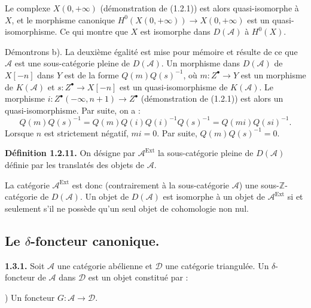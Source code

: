 \clearpage
{}%
\begingroup\small\setlength{\parskip}{0pt}\setlength{\emergencystretch}{1.5em}
\setlength{\abovedisplayskip}{4pt plus 2pt minus 2pt}%
\setlength{\belowdisplayskip}{4pt plus 2pt minus 2pt}%

Le complexe $X(0,+\infty)$ (démonstration de (1.2.1)) est alors
quasi-isomorphe à $X$, et le morphisme canonique
$H^0(X(0,+\infty))\longrightarrow X(0,+\infty)$ est un
quasi-isomorphisme. Ce qui montre que $X$ est isomorphe dans
$D(\mathcal A)$ à $H^0(X)$.

Démontrons b). La deuxième égalité est mise pour mémoire et résulte de ce
que $\mathcal A$ est une sous-catégorie pleine de $D(\mathcal A)$. Un
morphisme dans $D(\mathcal A)$ de $X[-n]$ dans $Y$ est de la forme
$Q(m)Q(s)^{-1}$, où $m\colon Z^\bullet\longrightarrow Y$ est un morphisme
de $K(\mathcal A)$ et $s\colon Z^\bullet\longrightarrow X[-n]$ est un
quasi-isomorphisme de $K(\mathcal A)$. Le morphisme
$i\colon Z^\bullet(-\infty,n+1)\longrightarrow Z^\bullet$ (démonstration de
(1.2.1)) est alors un quasi-isomorphisme. Par suite, on a :
\[
Q(m)Q(s)^{-1}=Q(m)Q(i)Q(i)^{-1}Q(s)^{-1}=Q(mi)Q(si)^{-1}.
\]
Lorsque $n$ est strictement négatif, $mi=0$. Par suite,
$Q(m)Q(s)^{-1}=0$.

\medskip\noindent\textbf{Définition 1.2.11.}\quad
On désigne par $\mathcal A^{\operatorname{Ext}}$ la sous-catégorie pleine de
$D(\mathcal A)$ définie par les translatés des objets de $\mathcal A$.

La catégorie $\mathcal A^{\operatorname{Ext}}$ est donc (contrairement à la
sous-catégorie $\mathcal A$) une sous-$\mathbb Z$-catégorie de
$D(\mathcal A)$. Un objet de $D(\mathcal A)$ est isomorphe à un objet de
$\mathcal A^{\operatorname{Ext}}$ si et seulement s'il ne possède qu'un seul
objet de cohomologie non nul.

\subsection{Le \texorpdfstring{$\delta$}{delta}-foncteur canonique.}

\noindent\textbf{1.3.1.}\quad
Soit $\mathcal A$ une catégorie abélienne et $\mathcal D$ une catégorie
triangulée. Un $\delta$-foncteur de $\mathcal A$ dans $\mathcal D$ est un
objet constitué par :

) Un foncteur $G\colon\mathcal A\longrightarrow\mathcal D$.

